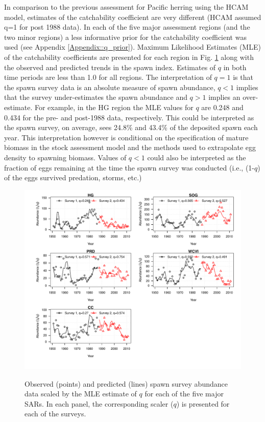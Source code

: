 In comparison to the previous assessment for Pacific herring using the HCAM model, estimates of the catchability coefficient are very different (HCAM assumed q=1 for post 1988 data).  In each of the five major assessment regions (and the two minor regions) a less informative prior for the catchability coefficient was used (see Appendix \ref{Appendix::q_prior}).  Maximum Likelihood Estimates (MLE) of the catchability coefficients are presented for each region in Fig. \ref{PartII:Results:fig3} along with the observed and predicted trends in the spawn index.  Estimates of $q$ in both time periods are less than 1.0 for all regions.  The interpretation of $q=1$ is that the spawn survey data is an absolute measure of spawn abundance, $q<1$ implies that the survey under-estimates the spawn abundance and $q>1$ implies an over-estimate.  For example, in the HG region the MLE values for $q$ are 0.248 and 0.434 for the pre- and post-1988 data, respectively. This could be interpreted as the spawn survey, on average, sees 24.8\% and 43.4\% of the deposited spawn each year.  This interpretation however is conditional on the specification of mature biomass in the stock assessment model and the methods used to extrapolate egg density to spawning biomass. Values of $q<1$ could also be interpreted as the fraction of eggs remaining at the time the spawn survey was conducted (i.e., (1-$q$) of the eggs survived predation, storms, etc.) 

\begin{figure}[!tbp]
	\includegraphics[width=\textwidth]{../FIGS/qPriorFigs/iscam_fig_surveyfit.pdf}\\
	\caption{Observed (points) and predicted (lines) spawn survey abundance data scaled by the MLE estimate of $q$ for each of the five major SARs.  In each panel, the corresponding scaler ($q$) is presented for each of the surveys.}\label{PartII:Results:fig3}
\end{figure}


